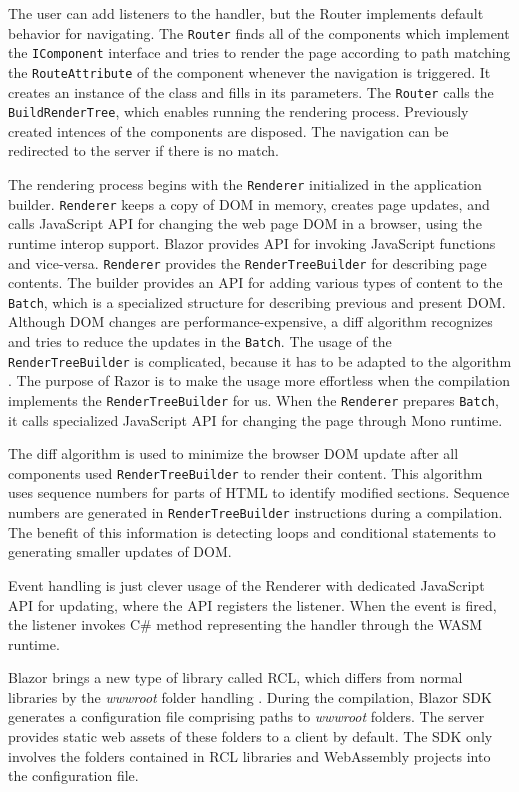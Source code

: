 The user can add listeners to the handler, but the Router implements default behavior for navigating.
The \texttt{Router} finds all of the components which implement the \texttt{IComponent} interface and tries to render the page according to path matching the \texttt{RouteAttribute} of the component whenever the navigation is triggered.
It creates an instance of the class and fills in its parameters.
The \texttt{Router} calls the \texttt{BuildRenderTree}, which enables running the rendering process.
Previously created intences of the components are disposed.
The navigation can be redirected to the server if there is no match.
\par
The rendering process begins with the \texttt{Renderer} initialized in the application builder.
\texttt{Renderer} keeps a copy of DOM in memory, creates page updates, and calls JavaScript API for changing the web page DOM in a browser, using the runtime interop support.
Blazor provides API for invoking JavaScript functions and vice-versa.
\texttt{Renderer} provides the \texttt{RenderTreeBuilder} for describing page contents.
The builder provides an API for adding various types of content to the \texttt{Batch}, which is a specialized structure for describing previous and present DOM.
Although DOM changes are performance-expensive, a diff algorithm \cite{online:diffAlgorithm} recognizes and tries to reduce the updates in the \texttt{Batch}.
The usage of the \texttt{RenderTreeBuilder} is complicated, because it has to be adapted to the algorithm \cite{online:renderTree}.
The purpose of Razor is to make the usage more effortless when the compilation implements the \texttt{RenderTreeBuilder} for us.
When the \texttt{Renderer} prepares \texttt{Batch}, it calls specialized JavaScript API for changing the page through Mono runtime.
\par
The diff algorithm is used to minimize the browser DOM  update after all components used \texttt{RenderTreeBuilder} to render their content.
This algorithm uses sequence numbers for parts of HTML to identify modified sections.
Sequence numbers are generated in \texttt{RenderTreeBuilder} instructions during a compilation.
The benefit of this information is detecting loops and conditional statements to generating smaller updates of DOM.  
\par
Event handling is just clever usage of the Renderer with dedicated JavaScript API for updating, where the API registers the listener.
When the event is fired, the listener invokes C\# method representing the handler through the WASM runtime.
\par
Blazor brings a new type of library called \ac{RCL}, which differs from normal libraries by the \textit{wwwroot} folder handling \cite{online:rcl}.
During the compilation, Blazor \ac{SDK} generates a configuration file comprising paths to \textit{wwwroot} folders.
The server provides static web assets of these folders to a client by default.
The SDK only involves the folders contained in RCL libraries and WebAssembly projects into the configuration file.

